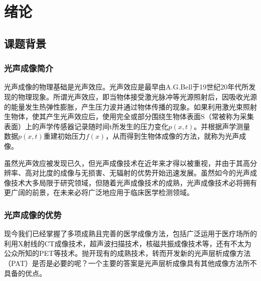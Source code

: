 
\chapter{绪论}
\label{cha:introduction}
\section{课题背景}
\label{sec:background}
\subsection{光声成像简介}
光声成像的物理基础是光声效应。光声效应是最早由A.G.Bell于19世纪20年代所发现的物理现象。所谓光声效应，即当物体接受激光脉冲等光源照射后，因吸收光源的能量发生热弹性膨胀，产生压力波并通过物体传播的现象。如果利用激光束照射生物体，使其产生光声效应后，使用完全或部分围绕生物体表面S（常被称为采集表面）上的声学传感器记录随时间t所发生的压力变化$p(x,t)$。并根据声学测量数据$p(x,t)$重建初始压力$f(x)$，从而得到生物体成像的方法，就称为光声成像。

虽然光声效应被发现已久，但光声成像技术在近年来才得以被重视，并由于其高分辨率、高对比度的成像与无损害、无辐射的优势开始迅速发展。虽然如今的光声成像技术大多局限于研究领域，但随着光声成像技术的成熟，光声成像技术必将拥有更广阔的前景，在未来必将广泛地应用于临床医学检测领域。

\subsection{光声成像的优势}
现今我们已经掌握了多项成熟且完善的医学成像方法，包括广泛运用于医疗场所的利用X射线的CT成像技术，超声波扫描技术，核磁共振成像技术等，还有不太为公众所知的PET等技术。抛开现有的成熟技术，转而开发新的光声层析成像方法（PAT）是否是必要的呢？一个主要的答案是光声层析成像具有其他成像方法所不具备的优点。

